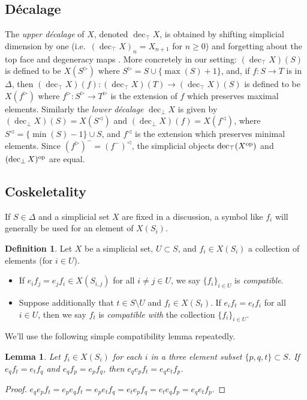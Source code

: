\documentclass{amsart}
\newcommand{\op}{\textup{op}}
\newcommand{\decbot}{\operatorname{dec}_\bot}
\newcommand{\dectop}{\operatorname{dec}_\top}
\newtheorem{lemma}[theorem]{Lemma}
\theoremstyle{definition}
\newtheorem{definition}[theorem]{Definition}
\theoremstyle{remark}
\begin{document}
\subsection{D\'ecalage} 
The \emph{upper d\'ecalage} of $X$, denoted $\dectop X$, is obtained by shifting simplicial dimension by one (i.e.\ $(\dectop X)_n = X_{n+1}$ for $n\geq 0$) and forgetting about the top face and degeneracy maps \cite[VI.1]{Illusie:CCD2}.
More concretely in our setting: $(\dectop X)(S)$ is defined to be $X(S^\triangleright)$ where $S^\triangleright = S \cup \{ \max(S) + 1 \}$, and, if $f\colon S \to T$ is in $\Delta$, then $(\dectop X) (f) \colon (\dectop X)(T) \to (\dectop X)(S)$ is defined to be $X(f^\triangleright)$ where $f^\triangleright \colon S^\triangleright \to T^\triangleright$ is the extension of $f$ which preserves maximal elements.
Similarly the \emph{lower d\'ecalage} $\decbot X$ is given by $(\decbot X)(S) = X(S^\triangleleft)$ and $(\decbot X)(f) = X(f^\triangleleft)$, where $S^\triangleleft = \{\min(S) - 1\} \cup S$, and $f^\triangleleft$ is the extension which  preserves minimal elements.
Since $(f^\triangleright)^- = (f^-)^\triangleleft$, 
the simplicial objects $\dectop (X^\op)$ and $(\decbot X)^\op$ are equal. 

\subsection{Coskeletality}

If $S \in \Delta$ and a simplicial set $X$ are fixed in a discussion, a symbol like $f_i$ will generally be used for an element of $X(S_i)$.

\begin{definition}
Let $X$ be a simplicial set, $U \subset S$, and $f_i \in X(S_i)$ a collection of elements (for $i\in U$).
\begin{itemize}
\item If $e_i f_j = e_j f_i \in X(S_{i,j})$ for all $i\neq j \in U$, we say $\{f_i\}_{i\in U}$ is \emph{compatible}.
\item Suppose additionally that $t \in S \setminus U$ and $f_t \in X(S_t)$. If $e_i f_t = e_t f_i$ for all $i\in U$, then we say $f_t$ is \emph{compatible with} the collection $\{f_i\}_{i\in U}$.
\end{itemize}
\end{definition}

We'll use the following simple compatibility lemma repeatedly.

\begin{lemma}\label{triv lemma}
Let $f_i \in X(S_i)$ for each $i$ in a three element subset $\{p,q,t\} \subset S$. 
If $e_qf_t = e_tf_q$ and $e_qf_p = e_p f_q$, then $e_q e_p f_t = e_q e_t f_p$.
\end{lemma}
\begin{proof} $e_q e_p f_t = e_p e_q f_t = e_p e_t f_q = e_t e_p f_q = e_t e_q f_p = e_q e_t f_p$.
\end{proof}
\end{document}
